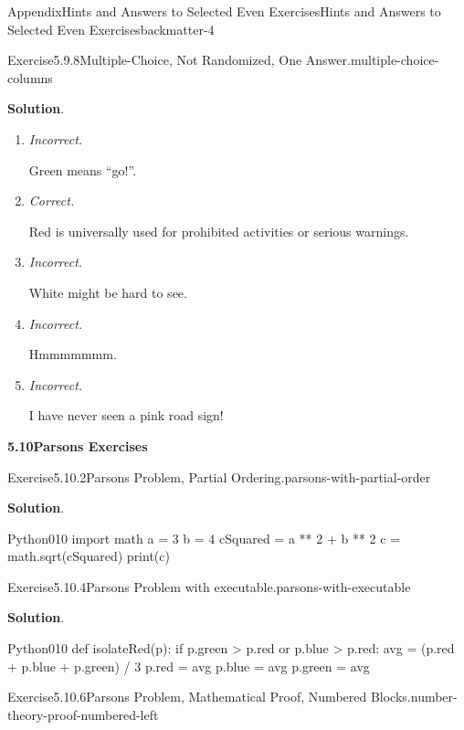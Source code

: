 \documentclass[oneside,10pt,]{book}
\newcommand{\blocktitlefont}{\relax}
\newcommand{\lititle}[1]{{\slshape#1}}
\numberwithin{equation}{section}
\begin{document}
\begin{solutions-chapter}{Appendix}{Hints and Answers to Selected Even Exercises}{}{Hints and Answers to Selected Even Exercises}{}{}{backmatter-4}
\begin{divisionsolution}{Exercise}{5.9.8}{Multiple-Choice, Not Randomized, One Answer.}{multiple-choice-columns}
\par\smallskip%
\noindent\textbf{\blocktitlefont Solution}.\hypertarget{multiple-choice-columns-7-back}{}\quad{}%
\begin{enumerate}[label={\Alph*.}]
\item{}\lititle{Incorrect.}\par%
Green means ``go!''.%
\item{}\lititle{Correct.}\par%
Red is universally used for prohibited activities or serious warnings.%
\item{}\lititle{Incorrect.}\par%
White might be hard to see.%
\item{}\lititle{Incorrect.}\par%
Hmmmmmmm.%
\item{}\lititle{Incorrect.}\par%
I have never seen a pink road sign!%
\end{enumerate}
%
\end{divisionsolution}%
\par\medskip
\noindent\textbf{\Large{}5.10\space\textperiodcentered\space{}Parsons Exercises}
\begin{divisionsolution}{Exercise}{5.10.2}{Parsons Problem, Partial Ordering.}{parsons-with-partial-order}%
\par\smallskip%
\noindent\textbf{\blocktitlefont Solution}.\hypertarget{parsons-with-partial-order-3-back}{}\quad{}\begin{program}{Python}{0}{1}{0}
import math
a = 3
b = 4
cSquared = a ** 2 + b ** 2
c = math.sqrt(cSquared)
print(c)
\end{program}
\end{divisionsolution}%
\begin{divisionsolution}{Exercise}{5.10.4}{Parsons Problem with executable.}{parsons-with-executable}%
\par\smallskip%
\noindent\textbf{\blocktitlefont Solution}.\hypertarget{parsons-with-executable-3-back}{}\quad{}\begin{program}{Python}{0}{1}{0}
def isolateRed(p):
    if p.green > p.red or p.blue > p.red:
        avg = (p.red + p.blue + p.green) / 3
        p.red = avg
        p.blue = avg
        p.green = avg
\end{program}
\end{divisionsolution}%
\begin{divisionsolution}{Exercise}{5.10.6}{Parsons Problem, Mathematical Proof, Numbered Blocks.}{number-theory-proof-numbered-left}%

\end{divisionsolution}
\end{solutions-chapter}
\end{document}
